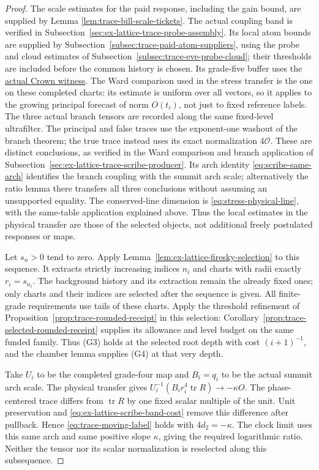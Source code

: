 \begin{proof}
The scale estimates for the paid response, including the gain bound,
are supplied by Lemma \ref{lem:trace-bill-scale-tickets}. The actual
coupling band is verified in
Subsection~\ref{sec:ex-lattice-trace-probe-assembly}. Its local atom
bounds are supplied by Subsection~\ref{subsec:trace-paid-atom-suppliers},
using the probe and cloud estimates of
Subsection~\ref{subsec:trace-eve-probe-cloud}; their thresholds are
included before the common history is chosen. Its grade-five buffer
uses the \hyperref[par:trace-actual-crown]{actual Crown witness}.
The Ward comparison used in the stress transfer is the one on these completed charts:
its estimate is uniform over all vectors, so it applies to the growing
principal forecast of norm $O(t_i)$, not just to fixed reference labels.
The three actual branch tensors are recorded along the same fixed-level
ultrafilter. The principal and false traces use the exponent-one
washout of the branch theorem; the true trace instead uses its exact
normalization $4\mathcal O$. These are distinct conclusions, as verified
in the Ward comparison and branch application of
Subsection~\ref{sec:ex-lattice-trace-scribe-producer}. Its arch identity
\eqref{eq:scribe-same-arch} identifies the branch coupling with the
summit arch scale; alternatively the ratio lemma there transfers all
three conclusions without assuming an unsupported equality.
The conserved-line dimension is \eqref{eq:stress-physical-line},
with the same-table application explained above. Thus the local
estimates in the physical transfer are those of the selected objects,
not additional freely postulated responses or maps.

Let $s_n>0$ tend to zero. Apply
Lemma~\ref{lem:ex-lattice-firesky-selection} to this sequence. It
extracts strictly increasing indices $n_i$ and charts with radii
exactly $r_i=s_{n_i}$. The background history and its extraction
remain the already fixed ones; only charts and their indices are
selected after the sequence is given. All finite-grade requirements
use tails of these charts. Apply the threshold refinement of
Proposition~\ref{prop:trace-rounded-receipt} in this selection:
Corollary~\ref{prop:trace-selected-rounded-receipt} supplies its
allowance and level budget on the same funded family. Thus (G3) holds
at the selected root depth with cost $(i+1)^{-1}$, and the chamber
lemma supplies (G4) at that very depth.

Take $U_i$ to be the completed grade-four map and $B_i=q_i$ to be
the actual summit arch scale. The physical transfer gives
$U_i^{-1}(B_i r_i^4\operatorname{tr}R)\to-\kappa O$.
The phase-centered trace differs from $\operatorname{tr}R$ by one
fixed scalar multiple of the unit. Unit preservation and
\eqref{eq:ex-lattice-scribe-band-cost} remove this difference after
pullback. Hence \eqref{eq:trace-moving-label} holds with
$4d_2=-\kappa$. The clock limit uses this same arch and same
positive slope $\kappa$, giving the required logarithmic ratio.
Neither the tensor nor its scalar normalization is reselected along
this subsequence.


\end{proof}
